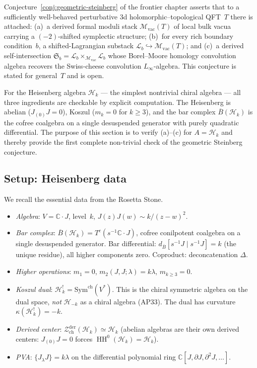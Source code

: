 \documentclass[11pt]{article}
\newcommand{\cM}{\mathcal{M}}
\newcommand{\cH}{\mathcal{H}}
\newcommand{\cZ}{\mathcal{Z}}
\newcommand{\cL}{\mathcal{L}}
\newcommand{\barB}{\overline{B}}
\newcommand{\C}{\mathbb{C}}
\newcommand{\HH}{\operatorname{HH}}
\newcommand{\Zder}{\cZ^{\mathrm{der}}_{\mathrm{ch}}}
\begin{document}
Conjecture~\ref{conj:geometric-steinberg} of the frontier chapter
asserts that to a sufficiently well-behaved perturbative 3d
holomorphic--topological QFT~$T$ there is attached: (a)~a derived
formal moduli stack $\cM_{\mathrm{vac}}(T)$ of local bulk vacua
carrying a $(-2)$-shifted symplectic structure; (b)~for every rich
boundary condition~$b$, a shifted-Lagrangian substack
$\cL_b \hookrightarrow \cM_{\mathrm{vac}}(T)$; and (c)~a derived
self-intersection $\mathfrak{S}_b = \cL_b \times_{\cM_{\mathrm{vac}}}
\cL_b$ whose Borel--Moore homology convolution algebra recovers
the Swiss-cheese convolution $L_\infty$-algebra.  This conjecture is
stated for general~$T$ and is open.

For the Heisenberg algebra $\cH_k$ --- the simplest nontrivial
chiral algebra --- all three ingredients are checkable by explicit
computation.  The Heisenberg is abelian ($J_{(0)}J = 0$), Koszul
($m_k = 0$ for $k \ge 3$), and the bar complex $\barB(\cH_k)$ is
the cofree coalgebra on a single desuspended generator with purely
quadratic differential.  The purpose of this section is to verify
(a)--(c) for $A = \cH_k$ and thereby provide the first complete
non-trivial check of the geometric Steinberg conjecture.

\subsection{Setup: Heisenberg data}

We recall the essential data from the Rosetta Stone.

\begin{itemize}[leftmargin=1.8em]
\item \emph{Algebra}: $V = \C \cdot J$, level~$k$,
  $J(z)J(w) \sim k/(z-w)^2$.

\item \emph{Bar complex}: $\barB(\cH_k) = T^c(s^{-1}\C\cdot J)$,
  cofree conilpotent coalgebra on a single desuspended generator.
  Bar differential: $d_{\barB}[s^{-1}J \mid s^{-1}J] = k$
  (the unique residue), all higher components zero.  Coproduct:
  deconcatenation $\Delta$.

\item \emph{Higher operations}: $m_1 = 0$,
  $m_2(J,J;\lambda) = k\lambda$, $m_{k \ge 3} = 0$.

\item \emph{Koszul dual}: $\cH_k^! = \mathrm{Sym}^{\mathrm{ch}}(V^*)$.
  This is the chiral symmetric algebra on the dual space, \emph{not}
  $\cH_{-k}$ as a chiral algebra (AP33).  The dual has curvature
  $\kappa(\cH_k^!) = -k$.

\item \emph{Derived center}: $\Zder(\cH_k) \simeq \cH_k$ (abelian
  algebras are their own derived centers: $J_{(0)}J = 0$ forces
  $\HH^0(\cH_k) = \cH_k$).

\item \emph{PVA}: $\{J_\lambda J\} = k\lambda$ on the differential
  polynomial ring $\C[J, \partial J, \partial^2 J, \ldots]$.
\end{itemize}
\end{document}
